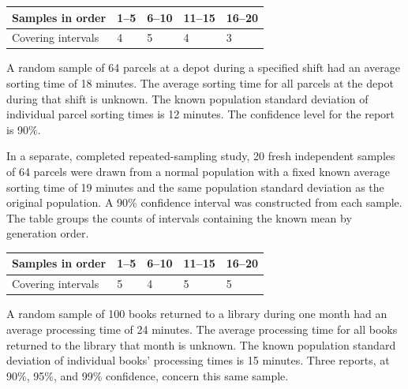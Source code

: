 \begin{center}\begin{tabular}{@{}lllll@{}}\toprule
Samples in order & 1--5 & 6--10 & 11--15 & 16--20\\\midrule
Covering intervals & 4 & 5 & 4 & 3\\
\bottomrule\end{tabular}\end{center}


A random sample of 64 parcels at a depot during a specified shift had an average sorting time of 18 minutes. The average sorting time for all parcels at the depot during that shift is unknown. The known population standard deviation of individual parcel sorting times is 12 minutes. The confidence level for the report is 90\%.

In a separate, completed repeated-sampling study, 20 fresh independent samples of 64 parcels were drawn from a normal population with a fixed known average sorting time of 19 minutes and the same population standard deviation as the original population. A 90\% confidence interval was constructed from each sample. The table groups the counts of intervals containing the known mean by generation order.

\begin{center}\begin{tabular}{@{}lllll@{}}\toprule
Samples in order & 1--5 & 6--10 & 11--15 & 16--20\\\midrule
Covering intervals & 5 & 4 & 5 & 5\\
\bottomrule\end{tabular}\end{center}


A random sample of 100 books returned to a library during one month had an average processing time of 24 minutes. The average processing time for all books returned to the library that month is unknown. The known population standard deviation of individual books' processing times is 15 minutes. Three reports, at 90\%, 95\%, and 99\% confidence, concern this same sample.

